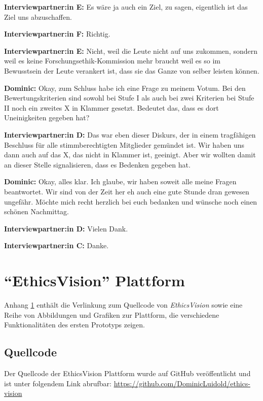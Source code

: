 \documentclass[a4paper,12pt,twoside]{scrreprt}
\begin{document}
\textbf{Interviewpartner:in E:} Es wäre ja auch ein Ziel, zu sagen, eigentlich ist das Ziel uns abzuschaffen.

\textbf{Interviewpartner:in F:} Richtig.

\textbf{Interviewpartner:in E:} Nicht, weil die Leute nicht auf uns zukommen, sondern weil es keine Forschungsethik-Kommission mehr braucht weil es so im Bewusstsein der Leute verankert ist, dass sie das Ganze von selber leisten können.

\textbf{Dominic:} Okay, zum Schluss habe ich eine Frage zu meinem Votum. Bei den Bewertungskriterien sind sowohl bei Stufe I als auch bei zwei Kriterien bei Stufe II noch ein zweites X in Klammer gesetzt. Bedeutet das, dass es dort Uneinigkeiten gegeben hat?

\textbf{Interviewpartner:in D:} Das war eben dieser Diskurs, der in einem tragfähigen Beschluss für alle stimmberechtigten Mitglieder gemündet ist. Wir haben uns dann auch auf das X, das nicht in Klammer ist, geeinigt. Aber wir wollten damit an dieser Stelle signalisieren, dass es Bedenken gegeben hat.

\textbf{Dominic:} Okay, alles klar. Ich glaube, wir haben soweit alle meine Fragen beantwortet. Wir sind von der Zeit her eh auch eine gute Stunde dran gewesen ungefähr. Möchte mich recht herzlich bei euch bedanken und wünsche noch einen schönen Nachmittag.

\textbf{Interviewpartner:in D:} Vielen Dank.

\textbf{Interviewpartner:in C:} Danke.

\cleardoublepage
\chapter{\enquote{EthicsVision} Plattform}
\label{appendix:ethics-vision}

Anhang \ref{appendix:ethics-vision} enthält die Verlinkung zum Quellcode von \textit{EthicsVision} sowie eine Reihe von Abbildungen und Grafiken zur Plattform, die verschiedene Funktionalitäten des ersten Prototyps zeigen.

\section{Quellcode}
\label{appendix:ethics-vision-quellcode}

Der Quellcode der EthicsVision Plattform wurde auf GitHub veröffentlicht und ist unter folgendem Link abrufbar: \url{https://github.com/DominicLuidold/ethics-vision}
\end{document}
